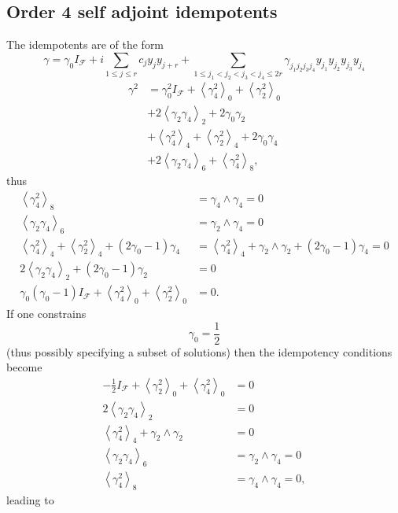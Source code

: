 \documentclass[aps,preprint]{revtex4}%
\begin{document}
\subsection{Order 4 self adjoint idempotents}

The idempotents are of the form
\begin{equation}
\gamma=\gamma_{0}I_{\mathcal{F}}+i\sum_{1\leq j\leq r}c_{j}y_{j}y_{j+r}%
+\sum_{1\leq j_{1}<j_{2}<j_{3}<j_{4}\leq2r}\gamma_{j_{1}j_{2}j_{3}j_{4}%
}y_{j_{1}}y_{j_{2}}y_{j_{3}}y_{j_{4}}%
\end{equation}%
\begin{align}
\gamma^{2}  &  =\gamma_{0}^{2}I_{\mathcal{F}}+\left\langle \gamma_{4}%
^{2}\right\rangle _{0}+\left\langle \gamma_{2}^{2}\right\rangle _{0}%
\nonumber\\
&  +2\left\langle \gamma_{2}\gamma_{4}\right\rangle _{2}+2\gamma_{0}\gamma
_{2}\nonumber\\
&  +\left\langle \gamma_{4}^{2}\right\rangle _{4}+\left\langle \gamma_{2}%
^{2}\right\rangle _{4}+2\gamma_{0}\gamma_{4}\nonumber\\
&  +2\left\langle \gamma_{2}\gamma_{4}\right\rangle _{6}+\left\langle
\gamma_{4}^{2}\right\rangle _{8},\nonumber
\end{align}
thus
\begin{align}
\left\langle \gamma_{4}^{2}\right\rangle _{8}  &  =\gamma_{4}\wedge\gamma
_{4}=0\\
\left\langle \gamma_{2}\gamma_{4}\right\rangle _{6}  &  =\gamma_{2}%
\wedge\gamma_{4}=0\\
\left\langle \gamma_{4}^{2}\right\rangle _{4}+\left\langle \gamma_{2}%
^{2}\right\rangle _{4}+\left(  2\gamma_{0}-1\right)  \gamma_{4}  &
=\left\langle \gamma_{4}^{2}\right\rangle _{4}+\gamma_{2}\wedge\gamma
_{2}+\left(  2\gamma_{0}-1\right)  \gamma_{4}=0\\
2\left\langle \gamma_{2}\gamma_{4}\right\rangle _{2}+\left(  2\gamma
_{0}-1\right)  \gamma_{2}  &  =0\\
\gamma_{0}\left(  \gamma_{0}-1\right)  I_{\mathcal{F}}+\left\langle \gamma
_{4}^{2}\right\rangle _{0}+\left\langle \gamma_{2}^{2}\right\rangle _{0}  &
=0.
\end{align}
If one constrains
\begin{equation}
\gamma_{0}=\frac{1}{2}%
\end{equation}
(thus possibly specifying a subset of solutions) then the idempotency
conditions become%
\begin{align}
-\frac{1}{2}I_{\mathcal{F}}+\left\langle \gamma_{2}^{2}\right\rangle
_{0}+\left\langle \gamma_{4}^{2}\right\rangle _{0}  &  =0\\
2\left\langle \gamma_{2}\gamma_{4}\right\rangle _{2}  &  =0\\
\left\langle \gamma_{4}^{2}\right\rangle _{4}+\gamma_{2}\wedge\gamma_{2}  &
=0\\
\left\langle \gamma_{2}\gamma_{4}\right\rangle _{6}  &  =\gamma_{2}%
\wedge\gamma_{4}=0\\
\left\langle \gamma_{4}^{2}\right\rangle _{8}  &  =\gamma_{4}\wedge\gamma
_{4}=0,
\end{align}
leading to
\end{document}
